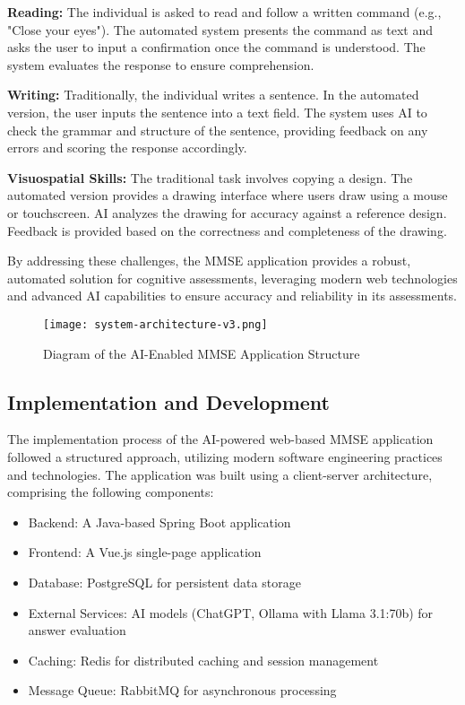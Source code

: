 \textbf{Reading:} The individual is asked to read and follow a written command (e.g., "Close your eyes"). The automated system presents the command as text and asks the user to input a confirmation once the command is understood. The system evaluates the response to ensure comprehension.

\textbf{Writing:} Traditionally, the individual writes a sentence. In the automated version, the user inputs the sentence into a text field. The system uses AI to check the grammar and structure of the sentence, providing feedback on any errors and scoring the response accordingly.

\textbf{Visuospatial Skills:} The traditional task involves copying a design. The automated version provides a drawing interface where users draw using a mouse or touchscreen. AI analyzes the drawing for accuracy against a reference design. Feedback is provided based on the correctness and completeness of the drawing.

By addressing these challenges, the MMSE application provides a robust, automated solution for cognitive assessments, leveraging modern web technologies and advanced AI capabilities to ensure accuracy and reliability in its assessments.

\begin{figure}[h!]
\begin{center}
\texttt{[image: system-architecture-v3.png]}
\caption{Diagram of the AI-Enabled MMSE Application Structure}
\label{fig:system-architecture}
\end{center}
\end{figure}

\subsection{Implementation and Development}

The implementation process of the AI-powered web-based MMSE application followed a structured approach, utilizing modern software engineering practices and technologies. The application was built using a client-server architecture, comprising the following components:
\begin{itemize}
    \item Backend: A Java-based Spring Boot application
    \item Frontend: A Vue.js single-page application
    \item Database: PostgreSQL for persistent data storage
    \item External Services: AI models (ChatGPT, Ollama with Llama 3.1:70b) for answer evaluation
    \item Caching: Redis for distributed caching and session management
    \item Message Queue: RabbitMQ for asynchronous processing
\end{itemize}


